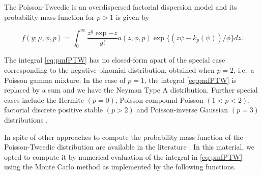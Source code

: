\documentclass[9pt,a5paper,]{book}
\newenvironment{Shaded}{}{}
\newcommand{\KeywordTok}[1]{\textbf{{#1}}}
\newcommand{\DataTypeTok}[1]{\underline{{#1}}}
\newcommand{\StringTok}[1]{{#1}}
\newcommand{\CommentTok}[1]{\textit{{#1}}}
\newcommand{\NormalTok}[1]{{#1}}
\renewenvironment{Shaded}{\color{inputcolor}}{}
\renewcommand{\DataTypeTok}[1]{{#1}}
\theoremstyle{definition}
\theoremstyle{definition}
\theoremstyle{remark}
\begin{document}
The Poisson-Tweedie is an overdispersed factorial dispersion model
\citep{Jorgensen2014} and its probability mass function for \(p > 1\) is
given by

\begin{equation}
f(y;\mu,\phi,p) = \int_0^\infty \frac{z^y \exp{-z}}{y!} a(z,\phi,p) \exp\{(z\psi - k_p(\psi))/\phi\} dz.
\label{eq:pmfPTW}
\end{equation}

The integral \eqref{eq:pmfPTW} has no closed-form apart of the special
case corresponding to the negative binomial distribution, obtained when
\(p = 2\), i.e.~a Poisson gamma mixture. In the case of \(p=1\), the
integral \eqref{eq:pmfPTW} is replaced by a sum and we have the Neyman
Type A distribution. Further special cases include the Hermite
\((p = 0)\), Poisson compound Poisson \((1 < p < 2)\), factorial
discrete positive stable \((p > 2)\) and Poisson-inverse Gaussian
\((p = 3)\) distributions \citetext{\citealp[
]{Jorgensen2014}; \citealp{Kokonendji2004}}.

In spite of other approaches to compute the probability mass function of
the Poisson-Tweedie distribution are available in the literature
\citetext{\citealp[ ]{Esnaola2013}; \citealp{Barabesi2016}}. In this
material, we opted to compute it by numerical evaluation of the integral
in \eqref{eq:pmfPTW} using the Monte Carlo method as implemented by the
following functions.

\begin{Shaded}
\end{Shaded}
\end{document}
